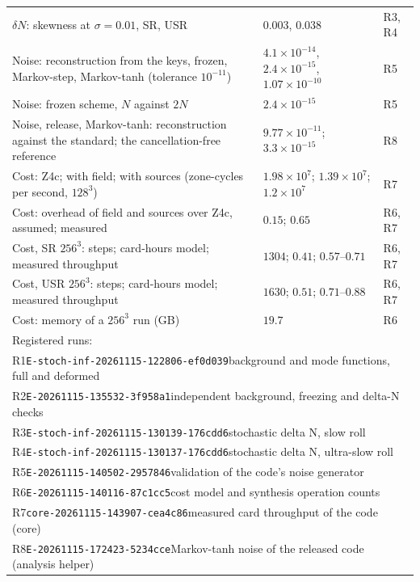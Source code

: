 \begin{table}
\begin{ruledtabular}
\begin{tabular}{p{}p{}p{}}
$\delta N$: skewness at $\sigma=0.01$, SR, USR & $0.003$, $0.038$ & R3, R4 \\
Noise: reconstruction from the keys, frozen, Markov-step, Markov-tanh (tolerance $10^{-11}$) & $4.1\times10^{-14}$, $2.4\times10^{-15}$, $1.07\times10^{-10}$ & R5 \\
Noise: frozen scheme, $N$ against $2N$ & $2.4\times10^{-15}$ & R5 \\
Noise, release, Markov-tanh: reconstruction against the standard; the cancellation-free reference & $9.77\times10^{-11}$; $3.3\times10^{-15}$ & R8 \\
Cost: Z4c; with field; with sources (zone-cycles per second, $128^3$) & $1.98\times10^{7}$; $1.39\times10^{7}$; $1.2\times10^{7}$ & R7 \\
Cost: overhead of field and sources over Z4c, assumed; measured & $0.15$; $0.65$ & R6, R7 \\
Cost, SR $256^3$: steps; card-hours model; measured throughput & $1304$; $0.41$; $0.57$--$0.71$ & R6, R7 \\
Cost, USR $256^3$: steps; card-hours model; measured throughput & $1630$; $0.51$; $0.71$--$0.88$ & R6, R7 \\
Cost: memory of a $256^3$ run (GB) & $19.7$ & R6 \\
\hline
\multicolumn{3}{l}{Registered runs:} \\
\multicolumn{3}{l}{R1\quad\texttt{E-stoch-inf-20261115-122806-ef0d039}\quad background and mode functions, full and deformed} \\
\multicolumn{3}{l}{R2\quad\texttt{E-20261115-135532-3f958a1}\quad independent background, freezing and delta-N checks} \\
\multicolumn{3}{l}{R3\quad\texttt{E-stoch-inf-20261115-130139-176cdd6}\quad stochastic delta N, slow roll} \\
\multicolumn{3}{l}{R4\quad\texttt{E-stoch-inf-20261115-130137-176cdd6}\quad stochastic delta N, ultra-slow roll} \\
\multicolumn{3}{l}{R5\quad\texttt{E-20261115-140502-2957846}\quad validation of the code's noise generator} \\
\multicolumn{3}{l}{R6\quad\texttt{E-20261115-140116-87c1cc5}\quad cost model and synthesis operation counts} \\
\multicolumn{3}{l}{R7\quad\texttt{core-20261115-143907-cea4c86}\quad measured card throughput of the code (core)} \\
\multicolumn{3}{l}{R8\quad\texttt{E-20261115-172423-5234cce}\quad Markov-tanh noise of the released code (analysis helper)} \\
\end{tabular}
\end{ruledtabular}
\end{table}
